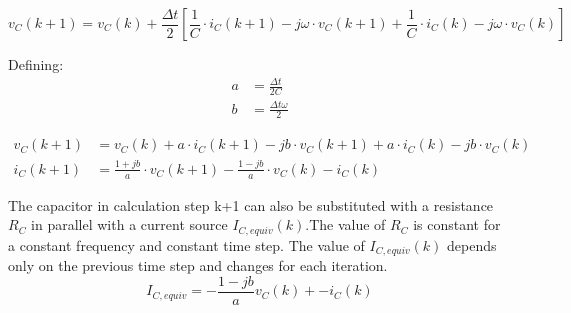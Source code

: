 \begin{equation}
        v_C(k+1) = v_C(k) + \frac{\Delta t}{2} \left[ \frac{1}{C} \cdot i_C(k+1) - j \omega \cdot v_C(k+1) + \frac{1}{C} \cdot i_C(k) - j \omega \cdot v_C(k) \right]
\end{equation}

Defining:
\begin{align}
        a &= \frac{\Delta t}{2C} \\
        b &= \frac{\Delta t \omega}{2}
\end{align}

\begin{align}
        v_C(k+1) &= v_C(k) + a \cdot i_C(k+1) - j b \cdot v_C(k+1) + a \cdot i_C(k) - j b \cdot v_C(k) \\
        i_C(k+1) &= \frac{1+jb}{a} \cdot v_C(k+1) - \frac{1-jb}{a} \cdot v_C(k) -i_C(k)
\end{align}

The capacitor in calculation step k+1 can also be substituted with a resistance $R_C$ in parallel with a current source $I_{C,equiv}(k)$.The value of $R_C$ is constant for a constant frequency and constant time step. The value of $I_{C,equiv}(k)$ depends only on the previous time step and changes for each iteration.
%
\begin{equation} \label{eq:AC}
	I_{C,equiv} = -\frac{1-jb}{a} v_C(k) + -i_C(k)
\end{equation}

